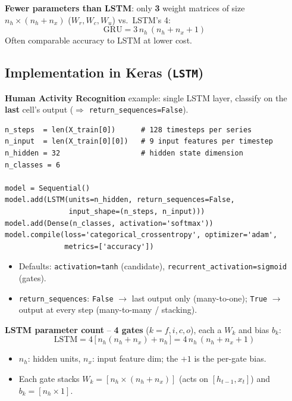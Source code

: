\documentclass[10pt,a4paper]{article}
\begin{document}
	\begin{importantbox}
		\textbf{Fewer parameters than LSTM}: only \textbf{3} weight matrices of size $n_h\times(n_h+n_x)$ ($W_r, W_c, W_u$) vs.\ LSTM's 4:
		\[
		\text{GRU} = 3\,n_h\,(n_h + n_x + 1)
		\]
		Often comparable accuracy to LSTM at lower cost.
	\end{importantbox}

	\subsection{Implementation in Keras (\texttt{LSTM})}

	\textbf{Human Activity Recognition} example: single LSTM layer, classify on the \textbf{last} cell's output ($\Rightarrow$ \texttt{return\_sequences=False}).

\begin{verbatim}
n_steps  = len(X_train[0])      # 128 timesteps per series
n_input  = len(X_train[0][0])   # 9 input features per timestep
n_hidden = 32                   # hidden state dimension
n_classes = 6

model = Sequential()
model.add(LSTM(units=n_hidden, return_sequences=False,
               input_shape=(n_steps, n_input)))
model.add(Dense(n_classes, activation='softmax'))
model.compile(loss='categorical_crossentropy', optimizer='adam',
              metrics=['accuracy'])
\end{verbatim}

	\begin{itemize}[leftmargin=*]
		\item Defaults: \texttt{activation=tanh} (candidate), \texttt{recurrent\_activation=sigmoid} (gates).
		\item \texttt{return\_sequences}: \texttt{False} $\to$ last output only (many-to-one); \texttt{True} $\to$ output at every step (many-to-many / stacking).
	\end{itemize}

	\begin{formulabox}
		\textbf{LSTM parameter count} -- \textbf{4 gates} ($k=f,i,c,o$), each a $W_k$ and bias $b_k$:
		\[
		\text{LSTM} = 4\,\big[\,n_h(n_h + n_x) + n_h\,\big] = 4\,n_h\,(n_h + n_x + 1)
		\]
	\end{formulabox}
	\begin{itemize}[leftmargin=*]
		\item $n_h$: hidden units, \; $n_x$: input feature dim; the $+1$ is the per-gate bias.
		\item Each gate stacks $W_{k}=[n_h\times(n_h+n_x)]$ (acts on $[h_{t-1},x_t]$) and $b_k=[n_h\times1]$.
	\end{itemize}
\end{document}
